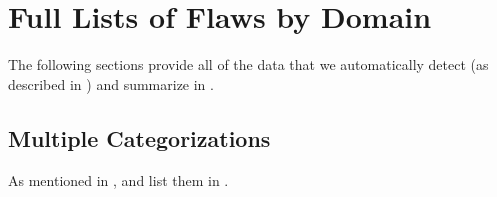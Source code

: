\section{Full Lists of Flaws by Domain}\label{flawDmn-full}

The following sections provide all of the data that we automatically detect
(as described in ) and summarize in .

\subsection{Multiple Categorizations}\label{multiCats-full}

As mentioned in , \multiCatIntro{} and list them in
.

\begin{landscape}
    
\end{landscape}


